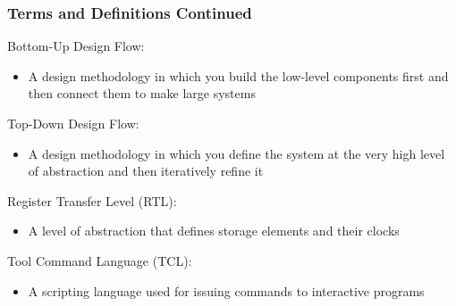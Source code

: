 \documentclass[t]{beamer}
\begin{document}
\begin{frame}
\frametitle{Terms and Definitions Continued}

Bottom-Up Design Flow:
\begin{itemize}
\item A design methodology in which you build the low-level components first and then connect them to make large systems
\end{itemize}
Top-Down Design Flow:
\begin{itemize}
\item A design methodology in which you define the system at the very high level of abstraction and then iteratively refine it
\end{itemize}
Register Transfer Level (RTL):
\begin{itemize}
\item A level of abstraction that defines storage elements and their clocks
\end{itemize}
Tool Command Language (TCL):
\begin{itemize}
\item A scripting language used for issuing commands to interactive programs
\end{itemize}
\end{frame}
\end{document}
